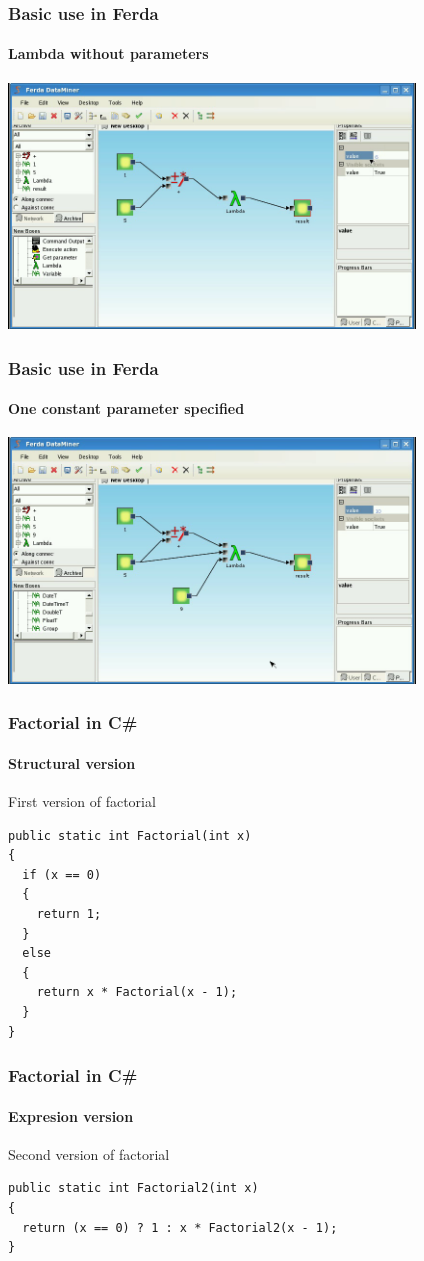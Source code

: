 \documentclass{beamer}
\begin{document}
\begin{frame}
	\frametitle{Basic use in Ferda}
	\framesubtitle{Lambda without parameters}

	\includegraphics[width=10.8cm]{lambdaBasic2.png}
\end{frame}

\begin{frame}
	\frametitle{Basic use in Ferda}
	\framesubtitle{One constant parameter specified}
	\includegraphics[width=10.8cm]{lambdaBasic3.png}
\end{frame}

\begin{frame}[fragile]
	\frametitle{Factorial in C\#}
	\framesubtitle{Structural version}

	\begin{block}{First version of factorial}
\begin{verbatim}
public static int Factorial(int x)
{
  if (x == 0)
  {
    return 1;
  }
  else
  {
    return x * Factorial(x - 1);
  }
}
\end{verbatim}
	\end{block}
\end{frame}

\begin{frame}[fragile]
	\frametitle{Factorial in C\#}
	\framesubtitle{Expresion version}

	\begin{block}{Second version of factorial}
\begin{verbatim}
public static int Factorial2(int x)
{
  return (x == 0) ? 1 : x * Factorial2(x - 1);
}
\end{verbatim}
	\end{block}
\end{frame}
\end{document}
